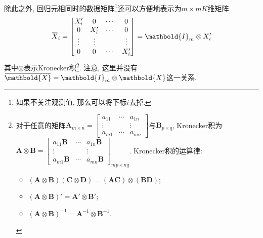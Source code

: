 \documentclass[cn, 12pt, math=mtpro2, bibstyle=apa, blue, twocol]{elegantbook}
\newcommand{\X}{\mathbold{X}}
\newcommand{\overbar}[1]{\mkern 1.5mu\overline{\mkern-1.5mu#1\mkern-1.5mu}\mkern 1.5mu}
\begin{document}
除此之外, 回归元相同时的数据矩阵\footnote{如果不关注观测值, 那么可以将下标$i$去掉.}还可以方便地表示为$m\times mK$维矩阵
$$\overbar{X}_i=\begin{bmatrix}
                              X_i' & 0 & \cdots & 0 \\
                              0 & X_i' & \cdots & 0 \\
                              \vdots & \vdots &  & \vdots \\
                              0 & 0 & \cdots & X_i'
                            \end{bmatrix}=\mathbold{I}_m\otimes X_i'$$
其中$\otimes$表示Kronecker积\footnote{对于任意的矩阵$\mathbold{A}_{m\times n}=\begin{bmatrix}
                                                                    a_{11} & \cdots & a_{1n} \\
                                                                    \vdots &  & \vdots \\
                                                                    a_{m1} & \cdots & a_{mn}
                                                                  \end{bmatrix}$与$\mathbold{B}_{p\times q}$, Kronecker积为$\mathbold{A}\otimes\mathbold{B}=\begin{bmatrix}
                                                                                                      a_{11}\mathbold{B} & \cdots & a_{1n}\mathbold{B} \\
                                                                                                       \vdots& & \vdots \\
                                                                                                       a_{m1}\mathbold{B}& \cdots & a_{mn}\mathbold{B}
                                                                                                    \end{bmatrix}_{mp\times nq}$.
Kronecker积的运算律: \begin{itemize}
                  \item $(\mathbold{A}\otimes \mathbold{B})(\mathbold{C}\otimes \mathbold{D})=(\mathbold{AC})\otimes(\mathbold{BD})$;
                  \item $(\mathbold{A}\otimes\mathbold{B})'=\mathbold{A}'\otimes\mathbold{B}'$;
                  \item $(\mathbold{A}\otimes\mathbold{B})^{-1}=\mathbold{A}^{-1}\otimes\mathbold{B}^{-1}$.
                \end{itemize}}.
注意, 这里并没有$\overbar{\X}=\mathbold{I}_m\otimes \X$这一关系.
\end{document}
